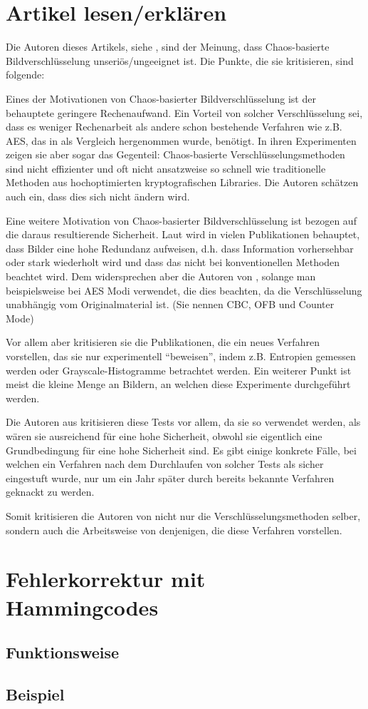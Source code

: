 \section{Artikel lesen/erklären}
Die Autoren dieses Artikels, siehe \cite{chaos}, sind der Meinung, dass Chaos-basierte Bildverschlüsselung
unseriös/ungeeignet ist. Die Punkte, die sie kritisieren, sind folgende:

Eines der Motivationen von Chaos-basierter Bildverschlüsselung ist der behauptete geringere Rechenaufwand.
Ein Vorteil von solcher Verschlüsselung sei, dass es weniger Rechenarbeit als andere schon bestehende
Verfahren wie z.B. AES, das in \cite{chaos} als Vergleich hergenommen wurde, benötigt. In ihren Experimenten
zeigen sie aber sogar das Gegenteil: Chaos-basierte Verschlüsselungsmethoden sind nicht effizienter und oft
nicht ansatzweise so schnell wie traditionelle Methoden aus hochoptimierten kryptografischen Libraries. Die Autoren
schätzen auch ein, dass dies sich nicht ändern wird.

Eine weitere Motivation von Chaos-basierter Bildverschlüsselung ist bezogen auf die daraus resultierende Sicherheit.
Laut \cite{chaos} wird in vielen Publikationen behauptet, dass Bilder eine hohe Redundanz aufweisen, d.h. dass Information vorhersehbar oder
stark wiederholt wird und dass das nicht bei konventionellen Methoden beachtet wird. Dem widersprechen aber die Autoren von \cite{chaos},
solange man beispielsweise bei AES Modi verwendet, die dies beachten, da die Verschlüsselung unabhängig vom Originalmaterial ist. (Sie nennen
CBC, OFB und Counter Mode)

Vor allem aber kritisieren sie die Publikationen, die ein neues Verfahren vorstellen, das sie
nur experimentell ``beweisen'', indem z.B. Entropien gemessen werden
oder Grayscale-Histogramme betrachtet werden. Ein weiterer Punkt ist meist die kleine Menge an Bildern, an welchen diese Experimente durchgeführt werden.

Die Autoren aus \cite{chaos} kritisieren diese Tests vor allem, da sie so verwendet werden, als wären sie ausreichend für eine hohe Sicherheit, obwohl
sie eigentlich eine Grundbedingung für eine hohe Sicherheit sind. Es gibt einige konkrete Fälle, bei welchen ein Verfahren nach dem Durchlaufen
von solcher Tests als sicher eingestuft wurde, nur um ein Jahr später durch bereits bekannte Verfahren geknackt zu werden.

Somit kritisieren die Autoren von \cite{chaos} nicht nur die Verschlüsselungsmethoden selber, sondern auch die Arbeitsweise von denjenigen, die
diese Verfahren vorstellen.

\section{Fehlerkorrektur mit Hammingcodes}
\subsection{Funktionsweise}
\subsection{Beispiel}




